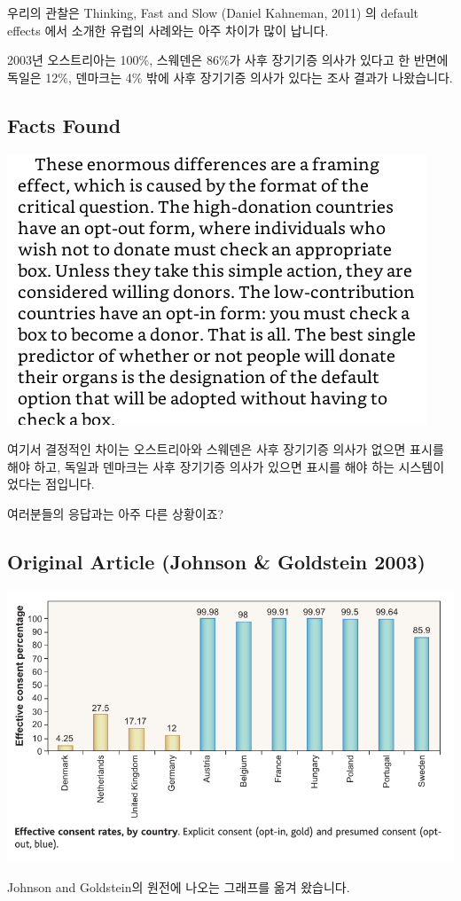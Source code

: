 \documentclass[
]{book}
\begin{document}
우리의 관찰은 Thinking, Fast and Slow (Daniel Kahneman, 2011) 의 default effects 에서 소개한 유럽의 사례와는 아주 차이가 많이 납니다.

2003년 오스트리아는 100\%, 스웨덴은 86\%가 사후 장기기증 의사가 있다고 한 반면에 독일은 12\%, 덴마크는 4\% 밖에 사후 장기기증 의사가 있다는 조사 결과가 나왔습니다.

\subsection{Facts Found}\label{facts-found-1}

\begin{flushleft}\includegraphics[width=0.5\linewidth]{./pics/organ_donation_02} \end{flushleft}

여기서 결정적인 차이는 오스트리아와 스웨덴은 사후 장기기증 의사가 없으면 표시를 해야 하고, 독일과 덴마크는 사후 장기기증 의사가 있으면 표시를 해야 하는 시스템이었다는 점입니다.

여러분들의 응답과는 아주 다른 상황이죠?

\subsection{Original Article (Johnson \& Goldstein 2003)}\label{original-article-johnson-goldstein-2003-1}

\begin{flushleft}\includegraphics[width=0.5\linewidth]{./pics/default_effects_by_country} \end{flushleft}

Johnson and Goldstein의 원전에 나오는 그래프를 옮겨 왔습니다.
\end{document}
